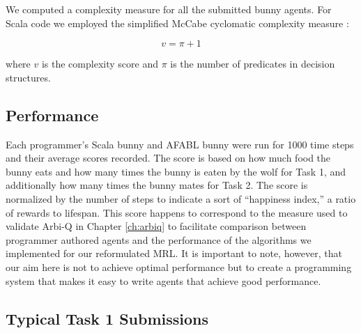We computed a complexity measure for all the submitted bunny agents. For Scala code we employed the simplified McCabe cyclomatic complexity measure \cite{mccabe1976complexity}:

\begin{equation}
v = \pi + 1
\end{equation}

where $v$ is the complexity score and $\pi$ is the number of predicates in decision structures.

\subsection{Performance}

Each programmer's Scala bunny and AFABL bunny were run for 1000 time steps and their average scores recorded. The score is based on how much food the bunny eats and how many times the bunny is eaten by the wolf for Task 1, and additionally how many times the bunny mates for Task 2. The score is normalized by the number of steps to indicate a sort of ``happiness index,'' a ratio of rewards to lifespan. This score happens to correspond to the measure used to validate Arbi-Q in Chapter \ref{ch:arbiq} to facilitate comparison between programmer authored agents and the performance of the algorithms we implemented for our reformulated MRL. It is important to note, however, that our aim here is not to achieve optimal performance but to create a programming system that makes it easy to write agents that achieve good performance.

\subsection{Typical Task 1 Submissions}

